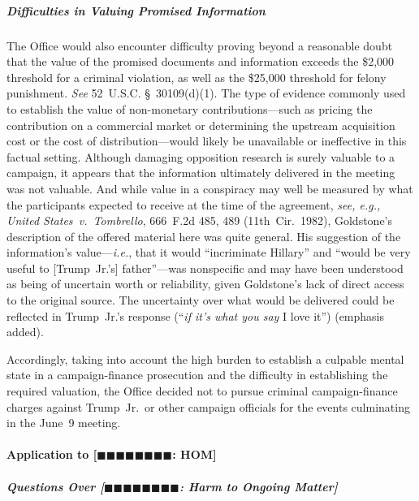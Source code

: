 \subparagraph{Difficulties in Valuing Promised Information}
The Office would also encounter difficulty proving beyond a reasonable doubt that the value of the promised documents and information exceeds the \$2,000 threshold for a criminal violation, as well as the \$25,000 threshold for felony punishment.
\textit{See} 52~U.S.C. \S~30109(d)(1).
The type of evidence commonly used to establish the value of non-monetary contributions---such as pricing the contribution on a commercial market or determining the upstream acquisition cost or the cost of distribution---would likely be unavailable or ineffective in this factual setting.
Although damaging opposition research is surely valuable to a campaign, it appears that the information ultimately delivered in the meeting was not valuable.
And while value in a conspiracy may well be measured by what the participants expected to receive at the time of the agreement, \textit{see, e.g., United States~v.\ Tombrello}, 666~F.2d 485, 489 (11th~Cir.~1982), Goldstone's description of the offered material here was quite general.
His suggestion of the information's value---\textit{i.e.}, that it would ``incriminate Hillary'' and ``would be very useful to [Trump~Jr.'s] father''---was nonspecific and may have been understood as being of uncertain worth or reliability, given Goldstone's lack of direct access to the original source.
The uncertainty over what would be delivered could be reflected in Trump~Jr.'s response (``\textit{if it's what you say} I love it'') (emphasis added).

Accordingly, taking into account the high burden to establish a culpable mental state in a campaign-finance prosecution and the difficulty in establishing the required valuation, the Office decided not to pursue criminal campaign-finance charges against Trump~Jr.\ or other campaign officials for the events culminating in the June~9 meeting.

\paragraph{Application to [$\blacksquare\blacksquare\blacksquare\blacksquare\blacksquare\blacksquare\blacksquare\blacksquare$: HOM]}

\subparagraph{Questions Over [$\blacksquare\blacksquare\blacksquare\blacksquare\blacksquare\blacksquare\blacksquare\blacksquare$: Harm to Ongoing Matter]}


